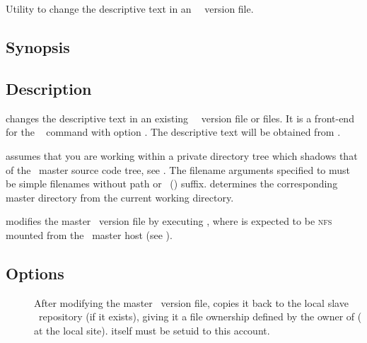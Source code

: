 
\newpage
\section{}
\label{am}

Utility to change the descriptive text in an \aipspp\ \rcs\ version
file.

\subsection*{Synopsis}

\begin{synopsis}
\end{synopsis}

\subsection*{Description}

 changes the descriptive text in an existing \aipspp\ \rcs\ version
file or files.  It is a front-end for the \rcs\  command with
option .  The descriptive text will be obtained from .

 assumes that you are working within a private directory tree which
shadows that of the \aipspp\ master source code tree, see .
The filename arguments specified to  must be simple filenames without
path or \rcs\ () suffix.   determines the corresponding
master directory from the current working directory.

 modifies the master \rcs\ version file by executing
, where  is expected to be
\textsc{nfs} mounted from the \aipspp\ master host (see
).

\subsection*{Options}

\begin{description}
\item[]
   After modifying the master \rcs\ version file,  copies it back to
   the local slave \rcs\ repository (if it exists), giving it a file
   ownership defined by the owner of  ( at the local
   site).   itself must be setuid to this account.
\end{description}

